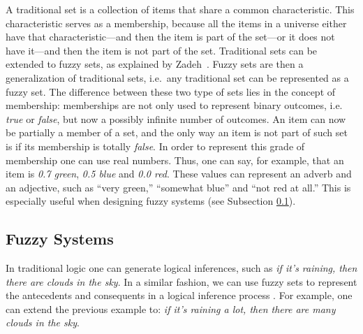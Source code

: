 ﻿\documentclass{ieeeaccess}
\begin{document}
A traditional set is a collection of items that share a common
characteristic. This characteristic serves as a membership, because all the
items in a universe either have that characteristic---and then the item is
part of the set---or it does not have it---and then the item is not part of
the set. Traditional sets can be extended to fuzzy sets, as explained by
Zadeh~\cite{Zadeh1965}. %
Fuzzy sets are then a generalization of traditional sets,
i.e.\ any traditional set can be represented as a fuzzy set. The difference
between these two type of sets lies in the concept of membership: memberships
are not only used to represent binary outcomes, i.e. \textit{true} or
\textit{false}, but now a possibly infinite number of outcomes. An item can now
be partially a member of a set, and the only way an item is not part of such set
is if its membership is totally \textit{false}. In order to represent this grade
of membership one can use real numbers. Thus, one can say, for example, that an
item is \textit{0.7 green}, \textit{0.5 blue} and \textit{0.0 red}. These values
can represent an adverb and an adjective, such as ``very green,'' ``somewhat
blue'' and ``not red at all.'' This is especially useful when designing fuzzy
systems (see Subsection \ref{subsection:fuzzy-systems}).

\subsection{Fuzzy Systems}
\label{subsection:fuzzy-systems}


In traditional logic one can generate logical inferences, such as \textit{if
it's raining, then there are clouds in the sky}. In a similar fashion, we can
use fuzzy sets to represent the antecedents and consequents in a logical
inference process \cite{kruse1994foundations}. For example, one can extend the previous example to:
\textit{if it's raining a lot, then there are many clouds in the sky}.
\end{document}
